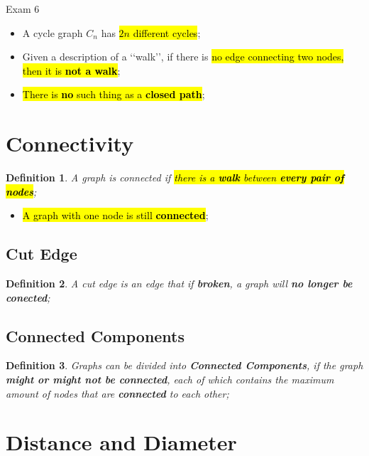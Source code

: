 \documentclass{note}
\newtheorem{definition}{Definition}
\begin{document}
\begin{note}{Exam 6}
        \begin{itemize}
            \item A cycle graph $ C_{n} $ has \hl{$ 2n $ different cycles};
            \item Given a description of a \lq\lq walk\rq\rq, if there is \hl{no edge connecting two nodes, then it is \textbf{not a walk}};
            \item \hl{There is \textbf{no} such thing as a \textbf{closed path}};
        \end{itemize}

        \section{Connectivity}

        \begin{definition}
            A graph is connected if \hl{there is a \textbf{walk} between \textbf{every pair of nodes}};
        \end{definition}

        \begin{itemize}
            \item \hl{A graph with one node is still \textbf{connected}};
        \end{itemize}

        \subsection{Cut Edge}

        \begin{definition}
            A cut edge is an edge that if \textbf{broken}, a graph will \textbf{no longer be conected};
        \end{definition}

        \subsection{Connected Components}

        \begin{definition}
            Graphs can be divided into \textbf{Connected Components}, if the graph \textbf{might or might not be connected},
            each of which contains the maximum amount of nodes that are \textbf{connected} to each other;
        \end{definition}

        \section{Distance and Diameter}


\end{note}
\end{document}
